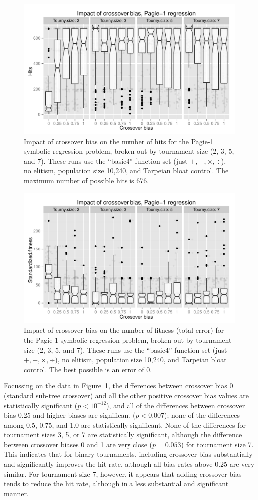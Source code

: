 \documentclass{sig-alternate}
\begin{document}
\begin{figure}
\centering
\includegraphics[width=0.45 \textwidth]{Plots/Pagie_1_strong_Hits_vs_Bias_Tournys_FunctionSet.pdf}
\caption{Impact of crossover bias on the number of hits for the Pagie-1 symbolic regression problem, broken out by 
tournament size (2, 3, 5, and 7). These runs use the ``basic4'' function set (just $+, -, \times, \div$), no elitism, 
population size 10,240, and Tarpeian bloat control. The maximum number of possible hits is 676.}
\label{fig:Pagie1StrongHits_Bias_Tournys_FunctionSet}
\end{figure}

\begin{figure}
\centering
\includegraphics[width=0.45 \textwidth]{Plots/Pagie_1_strong_Fitness_vs_Bias_Tournys_FunctionSet.pdf}
\caption{Impact of crossover bias on the number of fitness (total error) for the Pagie-1 symbolic regression problem, 
broken out by tournament size (2, 3, 5, and 7). These runs use the ``basic4'' function set (just $+, -, \times, \div$), no 
elitism, population size 10,240, and Tarpeian bloat control. The best possible is an error of 0.}
\label{fig:Pagie1StrongFitness_Bias_Tournys_FunctionSet}
\end{figure}

Focussing on the data in Figure~\ref{fig:Pagie1StrongHits_Bias_Tournys_FunctionSet}, the differences between 
crossover bias 0 (standard sub-tree crossover) and all the other positive crossover bias values are statistically 
significant ($p<10^{-12}$), and all of the differences between crossover bias 0.25 and higher biases are significant 
($p<0.007$); none of the differences among 0.5, 0.75, and 1.0 are statistically significant. None of the differences for 
tournament sizes 3, 5, or 7 are statistically significant, although the difference between crossover biases 0 and 1 are 
very close ($p=0.053$) for tournament size 7. This indicates that for binary tournaments, including crossover bias 
substantially and significantly improves the hit rate, although all bias rates above 0.25 are very similar. For tournament 
size 7, however, it appears that adding crossover bias tends to reduce the hit rate, although in a less substantial and 
significant manner.
\end{document}
